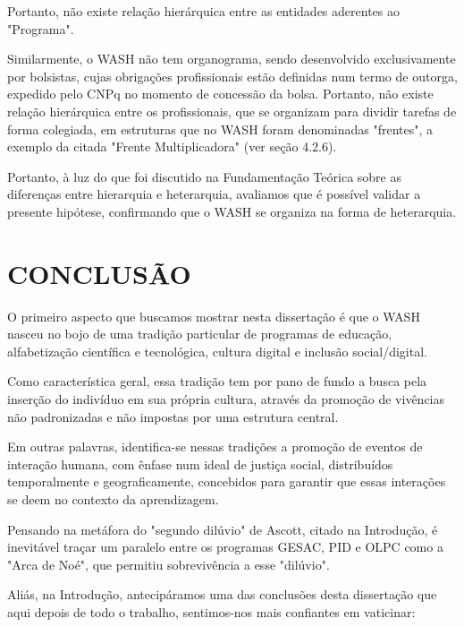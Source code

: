 Portanto, não existe relação hierárquica entre as entidades aderentes ao "Programa".

Similarmente, o WASH não tem organograma, sendo desenvolvido exclusivamente por bolsistas, cujas obrigações profissionais estão definidas num termo de outorga, expedido pelo CNPq no momento de concessão da bolsa. Portanto, não existe relação hierárquica entre os profissionais, que se organizam para dividir tarefas de forma colegiada, em estruturas que no WASH foram denominadas "frentes", a exemplo da citada "Frente Multiplicadora" (ver seção 4.2.6).

Portanto, à luz do que foi discutido na Fundamentação Teórica sobre as diferenças entre hierarquia e heterarquia, avaliamos que é possível validar a presente hipótese, confirmando que o WASH se organiza na forma de heterarquia.

\chapter[CONCLUSÃO]{CONCLUSÃO}\label{CONCLUSÃO}
O primeiro aspecto que buscamos mostrar nesta dissertação é que o WASH nasceu no bojo de uma tradição particular de programas de educação, alfabetização científica e tecnológica, cultura digital e inclusão social/digital.

Como característica geral, essa tradição tem por pano de fundo a busca pela inserção do indivíduo em sua própria cultura, através da promoção de vivências não padronizadas e não impostas por uma estrutura central.

Em outras palavras, identifica-se nessas tradições a promoção de eventos de interação humana, com ênfase num ideal de justiça social, distribuídos temporalmente e geograficamente, concebidos para garantir que essas interações se deem no contexto da aprendizagem.

Pensando na metáfora do "segundo dilúvio" de Ascott, citado na Introdução, é inevitável traçar um paralelo entre os programas GESAC, PID e OLPC como a "Arca de Noé", que permitiu sobrevivência a esse "dilúvio".

Aliás, na Introdução, antecipáramos uma das conclusões desta dissertação que aqui depois de todo o trabalho,  sentimos-nos mais confiantes em vaticinar:


\noindent\begin{flushright}\mbox{\linespread{1}\selectfont\centering{}}\end{flushright}


